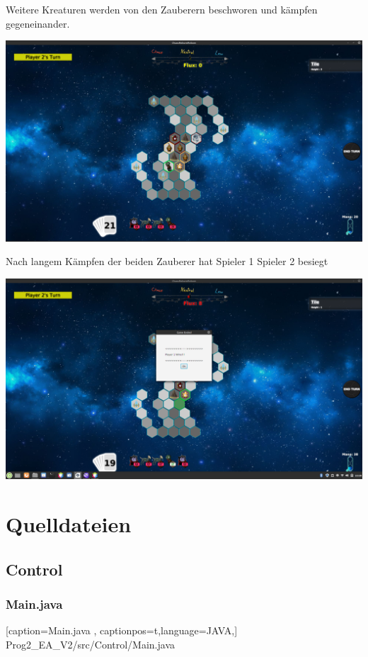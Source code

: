 \documentclass[a4paper,12pt]{scrartcl}
\begin{document}
	Weitere Kreaturen werden von den Zauberern beschworen und kämpfen gegeneinander. 
	\begin{center}\includegraphics[width=\textwidth]{Prog2_EA_V2/screenshots/Anwendung7.png}\end{center}
	Nach langem Kämpfen der beiden Zauberer hat Spieler 1 Spieler 2 besiegt
	\begin{center}\includegraphics[width=\textwidth]{Prog2_EA_V2/screenshots/Anwendung8.png}\end{center}
	\newpage
	\section{Quelldateien}
	
	\subsection{Control}
	\subsubsection{Main.java}
	
	[caption={Main.java}
	\label{lst:javaclass},
	captionpos=t,language=JAVA,]
	{Prog2_EA_V2/src/Control/Main.java}
\end{document}

